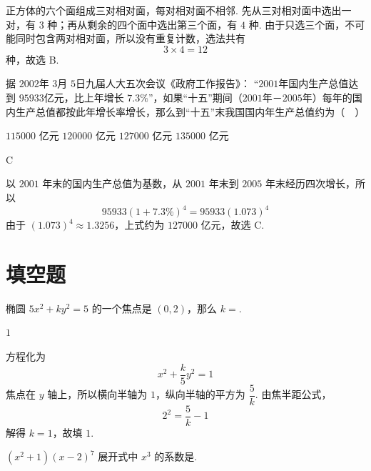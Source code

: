 \begin{solution}
正方体的六个面组成三对相对面，每对相对面不相邻. 先从三对相对面中选出一对，有 \(3\) 种；再从剩余的四个面中选出第三个面，有 \(4\) 种. 由于只选三个面，不可能同时包含两对相对面，所以没有重复计数，选法共有
\[
3\times4=12
\]
种，故选 B.
\end{solution}

\begin{problem}
据 \(2002\text{年}\) \(3\text{月}\) \(5\text{日}\)九届人大五次会议《政府工作报告》： “\(2001\text{年}\)国内生产总值达到 \(95933\text{亿元}\)，比上年增长 \(7.3\%\)”，如果“十五”期间（\(2001\text{年}\)－\(2005\text{年}\)）每年的国内生产总值都按此年增长率增长，那么到“十五”末我国国内年生产总值约为（\(\quad\)）

\choices
    {\(115000\) 亿元}
    {\(120000\) 亿元}
    {\(127000\) 亿元}
    {\(135000\) 亿元}
\end{problem}

\begin{answer}
C
\end{answer}

\begin{solution}
以 \(2001\) 年末的国内生产总值为基数，从 \(2001\) 年末到 \(2005\) 年末经历四次增长，所以
\[
95933(1+7.3\%)^4=95933(1.073)^4
\]
由于 \((1.073)^4\approx1.3256\)，上式约为 \(127000\) 亿元，故选 C.
\end{solution}

\section{填空题}

\begin{problem}
椭圆 \(5x^{2} + ky^{2} = 5\) 的一个焦点是 \((0,2)\)，那么 \(k =\)\fillinblank{}.
\end{problem}

\begin{answer}
\(1\)
\end{answer}

\begin{solution}
方程化为
\[
x^2+\frac{k}{5}y^2=1
\]
焦点在 \(y\) 轴上，所以横向半轴为 \(1\)，纵向半轴的平方为 \(\dfrac5k\). 由焦半距公式，
\[
2^2=\frac5k-1
\]
解得 \(k=1\)，故填 \(1\).
\end{solution}

\begin{problem}
\((x^{2} + 1)(x - 2)^{7}\) 展开式中 \(x^{3}\) 的系数是\fillinblank{}.
\end{problem}

